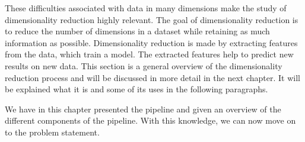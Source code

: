 These difficulties associated with data in many dimensions make the study of dimensionality reduction highly relevant. The goal of dimensionality reduction is to reduce the number of dimensions in a dataset while retaining as much information as possible. Dimensionality reduction is made by extracting features from the data, which train a model. The extracted features help to predict new results on new data. This section is a general overview of the dimensionality reduction process and will be discussed in more detail in the next chapter.
It will be explained what it is and some of its uses in the following paragraphs.











We have in this chapter presented the pipeline and given an overview of the different components of the pipeline. With this knowledge, we can now move on to the problem statement. 